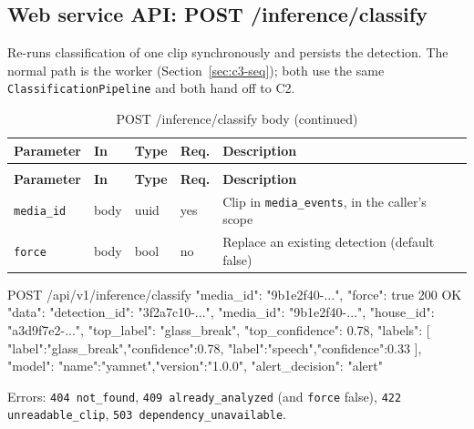 \subsection{Web service API: POST /inference/classify}
Re-runs classification of one clip synchronously and persists the detection. The normal path is the worker
(Section~\ref{sec:c3-seq}); both use the same \texttt{ClassificationPipeline} and both hand off to C2.
\begin{longtable}{L{2.6cm}L{1.4cm}L{1.8cm}L{1.1cm}L{7.0cm}}
\caption{POST /inference/classify body}\\
\toprule
\textbf{Parameter} & \textbf{In} & \textbf{Type} & \textbf{Req.} & \textbf{Description} \\
\midrule
\endfirsthead
\caption[]{POST /inference/classify body (continued)}\\
\toprule
\textbf{Parameter} & \textbf{In} & \textbf{Type} & \textbf{Req.} & \textbf{Description} \\
\midrule
\endhead
\texttt{media\_id} & body & uuid & yes & Clip in \texttt{media\_events}, in the caller's scope \\
\texttt{force} & body & bool & no & Replace an existing detection (default false) \\
\bottomrule
\end{longtable}
\begin{Shaded}
\begin{Code}
POST /api/v1/inference/classify { "media_id": "9b1e2f40-...", "force": true }
200 OK { "data": { "detection_id": "3f2a7c10-...", "media_id": "9b1e2f40-...", "house_id": "a3d9f7e2-...",
                   "top_label": "glass_break", "top_confidence": 0.78,
                   "labels": [ {"label":"glass_break","confidence":0.78}, {"label":"speech","confidence":0.33} ],
                   "model": {"name":"yamnet","version":"1.0.0"}, "alert_decision": "alert" } }
\end{Code}
\end{Shaded}
\noindent Errors: \texttt{404 not\_found}, \texttt{409 already\_analyzed} (and \texttt{force} false), \texttt{422 unreadable\_clip},
\texttt{503 dependency\_unavailable}.

